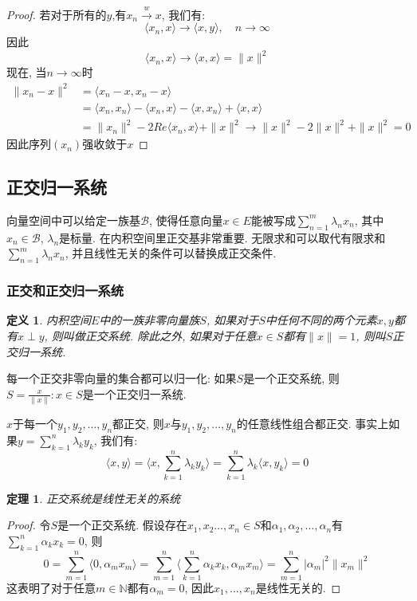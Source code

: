 \documentclass[a4paper,11pt]{article}
\newtheorem{definition}{\hspace{2em}定义}[section]
\newtheorem{theorem}{\hspace{2em}定理}[section]
\newtheorem{proof}{证明}[section]
\begin{document}
\begin{proof}
  若对于所有的$y$,有$x_n\stackrel{w}{\to}x$, 我们有:
  \begin{equation*}
    \langle x_n,x\rangle\to\langle x,y\rangle,\quad n\to\infty
  \end{equation*}
  因此
  \begin{equation*}
    \langle x_n,x\rangle\to\langle x,x\rangle=\|x\|^2
  \end{equation*}
  现在, 当$n\to\infty$时
  \begin{equation*}
    \begin{split}
       \|x_n-x\|^2 & =\langle x_n-x,x_n-x\rangle \\
         & =\langle x_n,x_n\rangle-\langle x_n,x\rangle-\langle x,x_n\rangle+\langle x,x\rangle \\
         & =\|x_n\|^2-2Re\langle x_n,x\rangle+\|x\|^2\to\|x\|^2-2\|x\|^2+\|x\|^2=0
    \end{split}
  \end{equation*}
  因此序列$(x_n)$强收敛于$x$
\end{proof}
\subsection{正交归一系统}
向量空间中可以给定一族基$\mathcal{B}$, 使得任意向量$x\in E$能被写成$\sum_{n=1}^{m}\lambda_nx_n$, 其中$x_n\in \mathcal{B}$, $\lambda_n$是标量. 在内积空间里正交基非常重要. 无限求和可以取代有限求和$\sum_{n=1}^{m}\lambda_nx_n$, 并且线性无关的条件可以替换成正交条件.
\subsubsection*{正交和正交归一系统}
\begin{definition}
  内积空间$E$中的一族非零向量族$S$, 如果对于$S$中任何不同的两个元素$x,y$都有$x\perp y$, 则叫做正交系统. 除此之外, 如果对于任意$x\in S$都有$\|x\|=1$, 则叫$S$正交归一系统.
\end{definition}
每一个正交非零向量的集合都可以归一化: 如果$S$是一个正交系统, 则$S={\frac{x}{\|x\|}:x\in S}$是一个正交归一系统.

$x$于每一个$y_1,y_2,\dots,y_n$都正交, 则$x$与$y_1,y_2,\dots,y_n$的任意线性组合都正交. 事实上如果$y=\sum_{k=1}^{n}\lambda_ky_k$, 我们有:
\begin{equation*}
  \langle x,y\rangle=\langle x,\sum_{k=1}^{n}\lambda_ky_k\rangle=\sum_{k=1}^{n}\lambda_k\langle x,y_k\rangle=0
\end{equation*}
\begin{theorem}
  正交系统是线性无关的系统
\end{theorem}
\begin{proof}
  令$S$是一个正交系统. 假设存在$x_1,x_2\dots,x_n\in S$和$\alpha_1,\alpha_2,\dots,\alpha_n$有$\sum_{k=1}^{n}\alpha_kx_k=0$, 则
  \begin{equation*}
    0=\sum_{m=1}^{n}\langle0,\alpha_mx_m\rangle=\sum_{m=1}^{n}\langle\sum_{k=1}^{n}\alpha_kx_k,\alpha_mx_m\rangle=\sum_{m=1}^{n}|\alpha_m|^2\|x_m\|^2
  \end{equation*}
  这表明了对于任意$m\in \mathbb{N}$都有$\alpha_m=0$, 因此$x_1,\dots,x_n$是线性无关的.
\end{proof}
\end{document}
